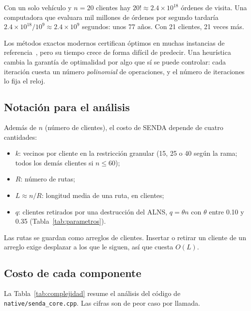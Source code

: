 \documentclass[11pt,a4paper]{article}
\newcommand{\tsl}[1]{\texttt{\small #1}}
\begin{document}
\begin{ejemplo}
Con un solo vehículo y $n=20$ clientes hay $20!\approx2.4\times10^{18}$ órdenes de visita. Una
computadora que evaluara mil millones de órdenes por segundo tardaría
$2.4\times10^{18}/10^9\approx2.4\times10^{9}$ segundos: unos 77 años. Con 21 clientes, 21 veces más.
\end{ejemplo}

Los métodos exactos modernos certifican óptimos en muchas instancias de referencia~\cite{queiroga2021},
pero su tiempo crece de forma difícil de predecir. Una heurística cambia la garantía de optimalidad
por algo que sí se puede controlar: cada iteración cuesta un número \emph{polinomial} de operaciones,
y el número de iteraciones lo fija el reloj.

\subsection{Notación para el análisis}

Además de $n$ (número de clientes), el costo de SENDA depende de cuatro cantidades:
\begin{itemize}[leftmargin=1.5em]
\item $k$: vecinos por cliente en la restricción granular (15, 25 o 40 según la rama; todos los
demás clientes si $n\le60$);
\item $R$: número de rutas;
\item $L\approx n/R$: longitud media de una ruta, en clientes;
\item $q$: clientes retirados por una destrucción del ALNS, $q=\theta n$ con $\theta$ entre 0.10 y
0.35 (Tabla~\ref{tab:parametros}).
\end{itemize}
Las rutas se guardan como arreglos de clientes. Insertar o retirar un cliente de un arreglo exige
desplazar a los que le siguen, así que cuesta $O(L)$.

\subsection{Costo de cada componente}

La Tabla~\ref{tab:complejidad} resume el análisis del código de \tsl{native/senda\_core.cpp}. Las
cifras son de peor caso por llamada.
\end{document}
